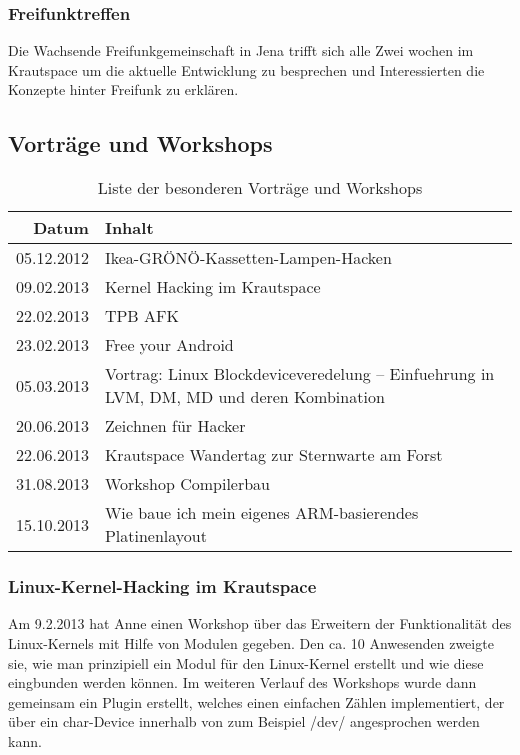 \documentclass[10pt,DIV16]{scrartcl}
\begin{document}
\subsubsection{Freifunktreffen}

Die Wachsende Freifunkgemeinschaft in Jena trifft sich alle Zwei wochen im 
Krautspace um die aktuelle Entwicklung zu besprechen und Interessierten die 
Konzepte hinter Freifunk zu erklären. 

\subsection{Vorträge und Workshops}

\begin{table}[h]
\begin{tabular}{r|l}
	\textbf{Datum} & \textbf{Inhalt} \\ \hline{}
	05.12.2012 & Ikea-GRÖNÖ-Kassetten-Lampen-Hacken\\
	09.02.2013 & Kernel Hacking im Krautspace\\
	22.02.2013 & TPB AFK\\
	23.02.2013 & Free your Android\\
	05.03.2013 & Vortrag: Linux Blockdeviceveredelung -- Einfuehrung in LVM, DM, MD und deren Kombination\\
	20.06.2013 & Zeichnen für Hacker\\
	22.06.2013 & Krautspace Wandertag zur Sternwarte am Forst\\
	31.08.2013 & Workshop Compilerbau\\
	15.10.2013 & Wie baue ich mein eigenes ARM-basierendes Platinenlayout
	\end{tabular}
	\caption{Liste der besonderen Vorträge und Workshops}
\end{table}

\subsubsection{Linux-Kernel-Hacking im Krautspace}

Am 9.2.2013 hat Anne einen Workshop über das Erweitern der
Funktionalität des Linux-Kernels mit Hilfe von Modulen gegeben. Den
ca. 10 Anwesenden zweigte sie, wie man prinzipiell ein Modul für den
Linux-Kernel erstellt und wie diese eingbunden werden können. Im
weiteren Verlauf des Workshops wurde dann gemeinsam ein Plugin
erstellt, welches einen einfachen Zählen implementiert, der über ein
char-Device innerhalb von zum Beispiel /dev/ angesprochen werden
kann.
\end{document}
